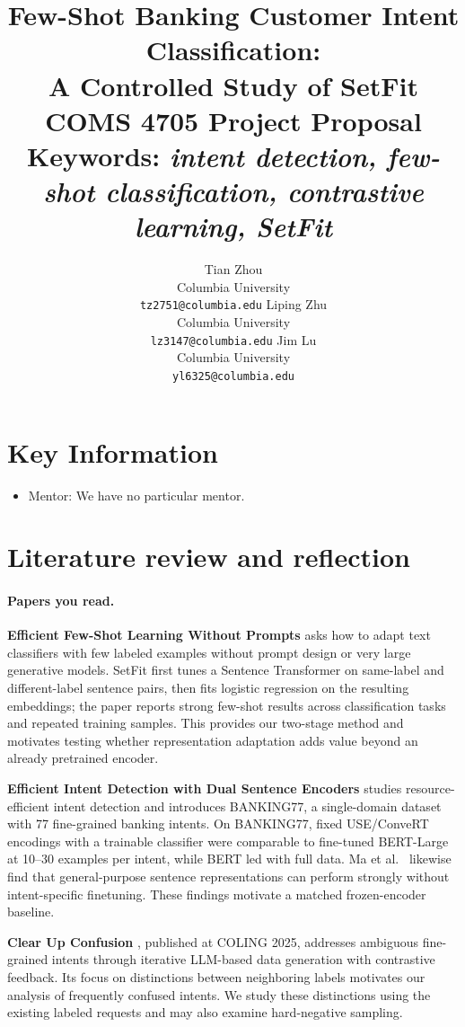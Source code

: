 \documentclass{article}
\title{Few-Shot Banking Customer Intent Classification:\\A Controlled Study of SetFit\\[0.5em]
\small\normalfont COMS 4705 Project Proposal\\
\small\normalfont\textbf{Keywords:} \textit{intent detection, few-shot classification, contrastive learning, SetFit}}
\author{Tian Zhou\\Columbia University\\\texttt{tz2751@columbia.edu}
\And Liping Zhu\\Columbia University\\\texttt{lz3147@columbia.edu}
\And Jim Lu\\Columbia University\\\texttt{yl6325@columbia.edu}}
\begin{document}
\maketitle

\section{Key Information}
\begin{itemize}
\item Mentor: We have no particular mentor.
\end{itemize}

\section{Literature review and reflection}
\paragraph{Papers you read.}
\textbf{Efficient Few-Shot Learning Without Prompts} \cite{tunstall2022setfit} asks how to adapt text classifiers with few labeled examples without prompt design or very large generative models. SetFit first tunes a Sentence Transformer on same-label and different-label sentence pairs, then fits logistic regression on the resulting embeddings; the paper reports strong few-shot results across classification tasks and repeated training samples. This provides our two-stage method and motivates testing whether representation adaptation adds value beyond an already pretrained encoder.



\textbf{Efficient Intent Detection with Dual Sentence Encoders} \cite{casanueva2020intent} studies resource-efficient intent detection and introduces BANKING77, a single-domain dataset with 77 fine-grained banking intents. On BANKING77, fixed USE/ConveRT encodings with a trainable classifier were comparable to fine-tuned BERT-Large at 10--30 examples per intent, while BERT led with full data. Ma et al.\ \cite{ma2022encoding} likewise find that general-purpose sentence representations can perform strongly without intent-specific finetuning. These findings motivate a matched frozen-encoder baseline.


\textbf{Clear Up Confusion} \cite{zhang2025confusion}, published at COLING 2025, addresses ambiguous fine-grained intents through iterative LLM-based data generation with contrastive feedback. Its focus on distinctions between neighboring labels motivates our analysis of frequently confused intents. We study these distinctions using the existing labeled requests and may also examine hard-negative sampling.
\end{document}
